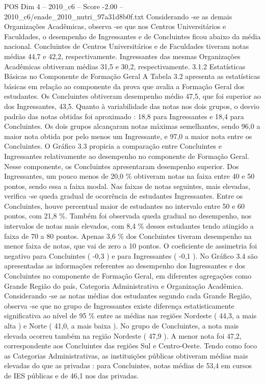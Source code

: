 \begin{textsample}{POS Dim 4 – 2010\_c6 – Score -2.00 – 2010\_c6/enade\_2010\_nutri\_97a31d8b0f.txt}
Considerando -se as demais Organizações Acadêmicas, observa -se que nos Centros Universitários e Faculdades, o desempenho de Ingressantes e de Concluintes ficou abaixo da média nacional.
Concluintes de Centros Universitários e de Faculdades tiveram notas médias 44,7 e 42,2, respectivamente.
Ingressantes das mesmas Organizações Acadêmicas obtiveram médias 31,5 e 30,2, respectivamente. 3.1.2 Estatísticas Básicas no Componente de Formação Geral A Tabela 3.2 apresenta as estatísticas básicas em relação ao componente da prova que avalia a Formação Geral dos estudantes.
Os Concluintes obtiveram desempenho médio 47,5, que foi superior ao dos Ingressantes, 43,5.
Quanto à variabilidade das notas nos dois grupos, o desvio padrão das notas obtidas foi aproximado : 18,8 para Ingressantes e 18,4 para Concluintes.
Os dois grupos alcançaram notas máximas semelhantes, sendo 96,0 a maior nota obtida por pelo menos um Ingressante, e 97,0 a maior nota entre os Concluintes.
O Gráfico 3.3 propicia a comparação entre Concluintes e Ingressantes relativamente ao desempenho no componente de Formação Geral.
Nesse componente, os Concluintes apresentaram desempenho superior.
Dos Ingressantes, um pouco menos de 20,0 \% obtiveram notas na faixa entre 40 e 50 pontos, sendo essa a faixa modal.
Nas faixas de notas seguintes, mais elevadas, verifica -se queda gradual de ocorrência de estudantes Ingressantes.
Entre os Concluintes, houve percentual maior de estudantes no intervalo entre 50 e 60 pontos, com 21,8 \%.
Também foi observada queda gradual no desempenho, nos intervalos de notas mais elevados, com 8,4 \% desses estudantes tendo atingido a faixa de 70 a 80 pontos.
Apenas 3,6 \% dos Concluintes tiveram desempenho na menor faixa de notas, que vai de zero a 10 pontos.
O coeficiente de assimetria foi negativo para Concluintes ( -0,3 ) e para Ingressantes ( -0,1 ).
No Gráfico 3.4 são apresentadas as informações referentes ao desempenho dos Ingressantes e dos Concluintes no componente de Formação Geral, em diferentes agregações como Grande Região do país, Categoria Administrativa e Organização Acadêmica.
Considerando -se as notas médias dos estudantes segundo cada Grande Região, observa -se que no grupo de Ingressantes existe diferença estatisticamente significativa ao nível de 95 \% entre as médias nas regiões Nordeste ( 44,3, a mais alta ) e Norte ( 41,0, a mais baixa ).
No grupo de Concluintes, a nota mais elevada ocorreu também na região Nordeste ( 47,9 ).
A menor nota foi 47,2, correspondente aos Concluintes das regiões Sul e Centro-Oeste.
Tendo como foco as Categorias Administrativas, as instituições públicas obtiveram médias mais elevadas do que as privadas : para Concluintes, notas médias de 53,4 em cursos de IES públicas e de 46,1 nos das privadas.

\end{textsample}

